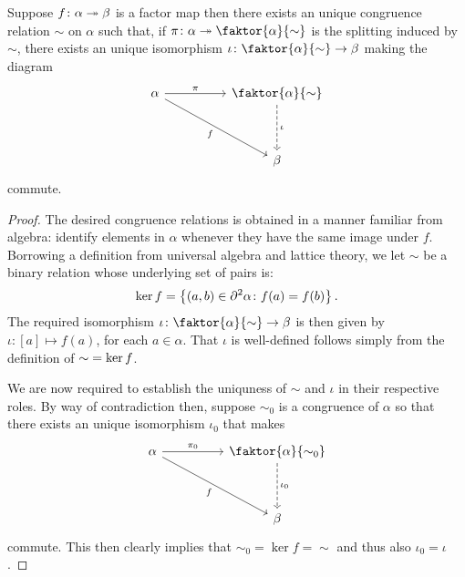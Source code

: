 \begin{prp}
         Suppose $f\colon\alpha\twoheadrightarrow\beta$ is a factor map then there exists an unique congruence relation $\sim$ on $\alpha$ such that, if $\pi\colon\alpha\tto\faktor{\alpha}{\sim}$ is the splitting induced by $\sim$, there exists an unique isomorphism $\iota\colon\faktor{\alpha}{\sim}\to\beta$ making the diagram
        \begin{equation}
            \begin{tikzcd}
		\alpha \arrow[rr, "\pi",rightarrow]&&   \faktor{\alpha}{\sim}\\
		\\
		 &&   \beta \arrow[from=uu,"\iota", dashrightarrow] \arrow[from=uull,"f"']
            \end{tikzcd}
        \end{equation}
        commute.
\end{prp}
\begin{proof}
	The desired congruence relations is obtained in a manner familiar from algebra:  identify elements in $\alpha$ whenever they have the same image under $f$.  Borrowing a definition from universal algebra and lattice theory, we let $\sim$ be a binary relation whose underlying set of pairs is:
	\begin{equation}
		\operatorname{ker} f=\left\lbrace (a,b)\in\partial^{2}\alpha\colon f(a)=f(b) \right\rbrace.
	\end{equation}
	The required isomorphism $\iota\colon\faktor{\alpha}{\sim}\to\beta$ is then given by $\iota\colon[a]\mapsto f(a)$, for each $a\in\alpha$.  That $\iota$ is well-defined follows simply from the definition of ${\sim}=\operatorname{ker} f$.

	We are now required to establish the uniquness of $\sim$ and $\iota$ in their respective roles.  By way of contradiction then, suppose $\sim_0$ is a congruence of $\alpha$ so that there exists an unique isomorphism $\iota_0$ that makes
        \begin{equation}
            \begin{tikzcd}
		\alpha \arrow[rr, "\pi_0",rightarrow]&&   \faktor{\alpha}{\sim_0}\\
		\\
		 &&   \beta \arrow[from=uu,"\iota_0", dashrightarrow] \arrow[from=uull,"f"']
            \end{tikzcd}
        \end{equation}
	commute.  This then clearly implies that ${\sim_0}=\ker f={\sim}$ and thus also $\iota_0=\iota$.
\end{proof}

